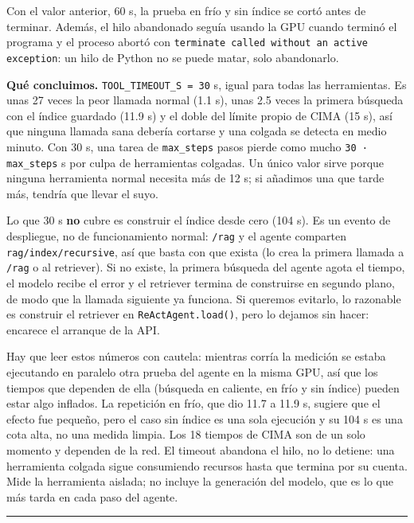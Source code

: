 Con el valor anterior, 60 s, la prueba en frío y sin índice se cortó antes de terminar. Además, el
hilo abandonado seguía usando la GPU cuando terminó el programa y el proceso abortó con \texttt{terminate called without an active exception}: un hilo de Python no se puede matar, solo abandonarlo.

\textbf{Qué concluimos.} \texttt{TOOL\_\allowbreak{}TIMEOUT\_\allowbreak{}S =\allowbreak{} 30} s, igual para todas las herramientas. Es unas 27 veces la
peor llamada normal (1.1 s), unas 2.5 veces la primera búsqueda con el índice guardado (11.9 s) y el
doble del límite propio de CIMA (15 s), así que ninguna llamada sana debería cortarse y una colgada
se detecta en medio minuto. Con 30 s, una tarea de \texttt{max\_\allowbreak{}steps} pasos pierde como mucho
\texttt{30 · max\_\allowbreak{}steps} s por culpa de herramientas colgadas. Un único valor sirve porque ninguna
herramienta normal necesita más de 12 s; si añadimos una que tarde más, tendría que llevar el suyo.

Lo que 30 s \textbf{no} cubre es construir el índice desde cero (104 s). Es un evento de despliegue, no de
funcionamiento normal: \texttt{/\allowbreak{}rag} y el agente comparten \texttt{rag/\allowbreak{}index/\allowbreak{}recursive}, así que basta con que
exista (lo crea la primera llamada a \texttt{/\allowbreak{}rag} o al retriever). Si no existe, la primera búsqueda del
agente agota el tiempo, el modelo recibe el error y el retriever termina de construirse en segundo
plano, de modo que la llamada siguiente ya funciona. Si queremos evitarlo, lo razonable es construir
el retriever en \texttt{ReActAgent.load()}, pero lo dejamos sin hacer: encarece el arranque de la API.

Hay que leer estos números con cautela: mientras corría la medición se estaba ejecutando en paralelo otra prueba del
agente en la misma GPU, así que los tiempos que dependen de ella (búsqueda en caliente, en frío y
sin índice) pueden estar algo inflados. La repetición en frío, que dio 11.7 a 11.9 s, sugiere que el
efecto fue pequeño, pero el caso sin índice es una sola ejecución y su 104 s es una cota alta, no una
medida limpia. Los 18 tiempos de CIMA son de un solo momento y dependen de la red. El timeout abandona
el hilo, no lo detiene: una herramienta colgada sigue consumiendo recursos hasta que termina por su cuenta.
Mide la herramienta aislada; no incluye la generación del modelo, que es lo que más tarda en cada paso del agente.

\begin{center}\rule{0.5\linewidth}{0.5pt}\end{center}


